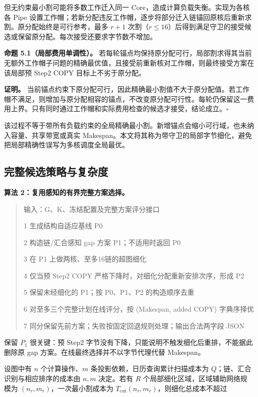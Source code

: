 \documentclass[anonymous,notoc]{gmcm2026}
\begin{document}
但无约束最小割可能将多数工作迁入同一 Core，造成计算负载失衡。实现为各核各 Pipe 设置工作帽；若新分配违反工作帽，逐步将部分迁入链锚回原核后重新求割。原分配始终是可行参考，最多 \(r+1\) 次割（\(r\le16\)）后得到满足守卫的接受候选或保留原分配。每次接受还要求字节数不增加。

\textbf{命题 5.1（局部费用单调性）。} 若每轮锚点均保持原分配可行，局部割求得其当前无额外工作帽子问题的精确最优值，且接受前重新核对工作帽，则最终接受方案在该局部预 Step2 COPY 目标上不劣于原分配。

\textbf{证明。} 当前锚点约束下原分配可行，因此精确最小割值不大于原分配值。若工作帽不满足，则增加与原分配相容的锚点，不改变原分配可行性。每轮仍保留这一费用上界。只有同时通过工作帽和实际费用检查的候选才接受，结论成立。\(\square\)

该过程不等于带所有负载约束的全局精确最小割。新增锚点会缩小可行域，也未纳入容量、共享带宽或真实 Makespan。本文将其称为带守卫的局部字节细化，避免把局部精确性误写为多核调度全局最优。

\subsection{完整候选策略与复杂度}\label{ux5b8cux6574ux5019ux9009ux7b56ux7565ux4e0eux590dux6742ux5ea6}

\textbf{算法 2：复用感知的有界完整方案选择。}

\begin{quote}
输入：G、K、冻结配置及完整方案评分接口

1 生成结构自适应基线 P0

2 构造链/汇合感知 gap 方案 P1；不适用时返回 P0

3 在 P1 上做两核、至多16链的超图细化

4 仅当预 Step2 COPY 严格下降时，对细化分配重新安排次序，形成 P2

5 保留未经细化的 P1；按 P0、P1、P2 的构造顺序去重

6 对至多三个完整计划在线评分，按 (Makespan, added COPY) 字典序择优

7 同分保留先前方案；失败按固定回退规则处理；输出合法两字段 JSON
\end{quote}

保留 \(P_1\) 很关键：预 Step2 字节没有下降，只能说明不触发细化后重排，不能据此删除原 gap 方案。在线最终选择并不以字节代理代替 Makespan。

设图中有 \(n\) 个计算操作、\(m\) 条投影依赖，日历查询累计扫描成本为 \(Q\)；链、汇合识别与相应排序的成本由 \(n,m\) 决定。若有 \(R\) 个局部细化区域，区域辅助网络规模为 \((n_r,m_r)\)，一次最小割成本为 \(T_{\mathrm{cut}}(n_r,m_r)\)，则细化总成本不超过
\end{document}
